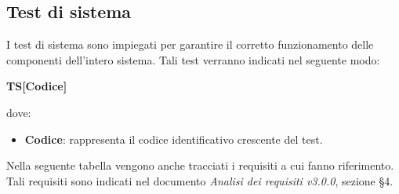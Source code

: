 \subsection{Test di sistema}
I test di sistema sono impiegati per garantire il corretto funzionamento delle componenti dell'intero sistema. Tali test verranno indicati nel seguente modo:\\
	\centerline{\textbf{TS[Codice]}}
dove:
\begin{itemize}
	\item \textbf{Codice}: rappresenta il codice identificativo crescente del test.
\end{itemize}
	Nella seguente tabella vengono anche tracciati i requisiti a cui fanno riferimento. Tali requisiti sono indicati nel documento \textit{Analisi dei requisiti v3.0.0}, sezione §4.

	\renewcommand{\arraystretch}{1.5}
	
